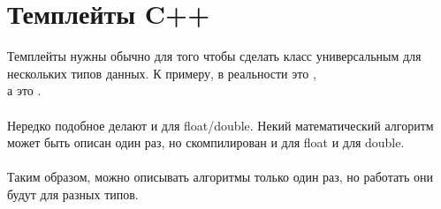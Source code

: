 \chapter{Темплейты C++}

Темплейты нужны обычно для того чтобы сделать класс универсальным для нескольких типов данных.
К примеру,  в реальности это , \\ 
а  это . \\
\\
Нередко подобное делают и для float/double. Некий математический алгоритм может быть описан один раз,
но скомпилирован и для float и для double. \\
\\
Таким образом, можно описывать алгоритмы только один раз, но работать они будут для разных типов.

